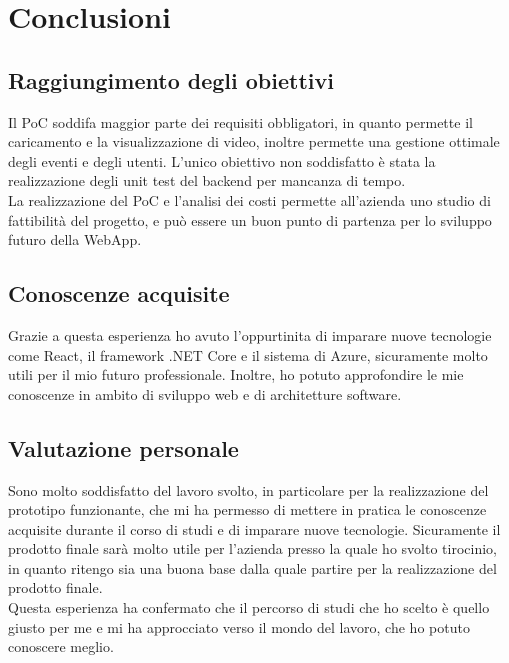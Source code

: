 \chapter{Conclusioni}
\label{cap:conclusioni}

\section{Raggiungimento degli obiettivi}
Il PoC soddifa maggior parte dei requisiti obbligatori, in quanto permette il caricamento e la visualizzazione di video, inoltre permette una gestione ottimale degli eventi e degli utenti. L'unico obiettivo non soddisfatto è stata la realizzazione degli unit test del backend per mancanza di tempo.\\
La realizzazione del PoC e l'analisi dei costi permette all'azienda uno studio di fattibilità del progetto, e può essere un buon punto di partenza per lo sviluppo futuro della WebApp.

\section{Conoscenze acquisite}
Grazie a questa esperienza ho avuto l'oppurtinita di imparare nuove tecnologie come React, il framework .NET Core e il sistema di Azure, sicuramente molto utili per il mio futuro professionale. Inoltre, ho potuto approfondire le mie conoscenze in ambito di sviluppo web e di architetture software.\\
\section{Valutazione personale}
Sono molto soddisfatto del lavoro svolto, in particolare per la realizzazione del prototipo funzionante, che mi ha permesso di mettere in pratica le conoscenze acquisite durante il corso di studi e di imparare nuove tecnologie. Sicuramente il prodotto finale sarà molto utile per l'azienda presso la quale ho svolto tirocinio, in quanto ritengo sia una buona base dalla quale partire per la realizzazione del prodotto finale.\\ 
Questa esperienza ha confermato che il percorso di studi che ho scelto è quello giusto per me e mi ha approcciato verso il mondo del lavoro, che ho potuto conoscere meglio.\\